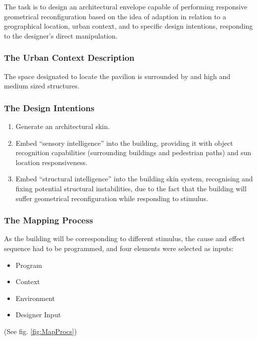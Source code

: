 The task is to design an architectural envelope capable of performing responsive geometrical reconfiguration based on the idea of adaption in relation to a geographical location, urban context, and to specific design intentions, responding to the designer's direct manipulation.

\subsubsection{The Urban Context Description}

The space designated to locate the pavilion is surrounded by and high and medium sized structures.

\subsubsection{The Design Intentions} 
\vspace{-0.3cm}
\begin{enumerate}
\item Generate an architectural skin.
\item Embed ``sensory intelligence'' into the building, providing it with object recognition capabilities (surrounding buildings and pedestrian paths) and sun location responsiveness.
\item Embed ``structural intelligence'' into the building skin system, recognising and fixing potential structural instabilities, due to the fact that the building will suffer geometrical reconfiguration while responding to stimulus.
\end{enumerate}
\vspace{-0.4cm}

\subsubsection{The Mapping Process}

As the building will be corresponding to different stimulus, the cause and effect sequence had to be programmed, and four elements were selected as inputs:
\vspace{-0.3cm}
\begin{itemize}[nolistsep]
\item Program
\item Context
\item Environment
\item Designer Input
\end{itemize}
\vspace{-0.4cm}
(See fig. \ref{fig:MapProcs})

